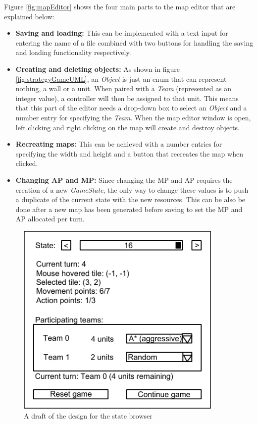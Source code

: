 \documentclass[11pt, a4paper]{report}
\begin{document}
Figure \ref{fig:mapEditor} shows the four main parts to the map editor that are explained below:
\begin{itemize}
  \item \textbf{Saving and loading:} This can be implemented with a text input for entering the name of a file combined with two buttons for handling the saving and loading functionality respectively. 
  \item \textbf{Creating and deleting objects:} As shown in figure \ref{fig:strategyGameUML}, an \emph{Object} is just an enum that can represent nothing, a wall or a unit. When paired with a \emph{Team} (represented as an integer value), a controller will then be assigned to that unit. This means that this part of the editor needs a drop-down box to select an \emph{Object} and a number entry for specifying the \emph{Team}. When the map editor window is open, left clicking and right clicking on the map will create and destroy objects.
  \item \textbf{Recreating maps:} This can be achieved with a number entries for specifying the width and height and a button that recreates the map when clicked. 
  \item \textbf{Changing AP and MP:} Since changing the MP and AP requires the creation of a new \emph{GameState}, the only way to change these values is to push a duplicate of the current state with the new resources. This can be also be done after a new map has been generated before saving to set the MP and AP allocated per turn.
\end{itemize}

\begin{figure}[!h]
  \centering
  \includegraphics[width=10cm]{img/state_browser.png}
  \caption{A draft of the design for the state browser}
  \label{fig:stateBrowser}
\end{figure}
\end{document}
